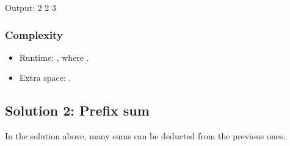 \documentclass[letterpaper,12pt,english]{book}
\begin{document}
\begin{sphinxVerbatim}[commandchars=\\\{\}]
\end{sphinxVerbatim}

\begin{sphinxVerbatim}[commandchars=\\\{\}]
Output:
2
2
3
\end{sphinxVerbatim}


\subsubsection{Complexity}
\label{\detokenize{Prefix_Sum/560_Subarray_Sum_Equals_K:complexity}}\begin{itemize}
\item {} 
\sphinxAtStartPar
Runtime: , where .

\item {} 
\sphinxAtStartPar
Extra space: .

\end{itemize}


\subsection{Solution 2: Prefix sum}
\label{\detokenize{Prefix_Sum/560_Subarray_Sum_Equals_K:solution-2-prefix-sum}}
\sphinxAtStartPar
In the solution above, many sums can be deducted from the previous ones.
\end{document}
